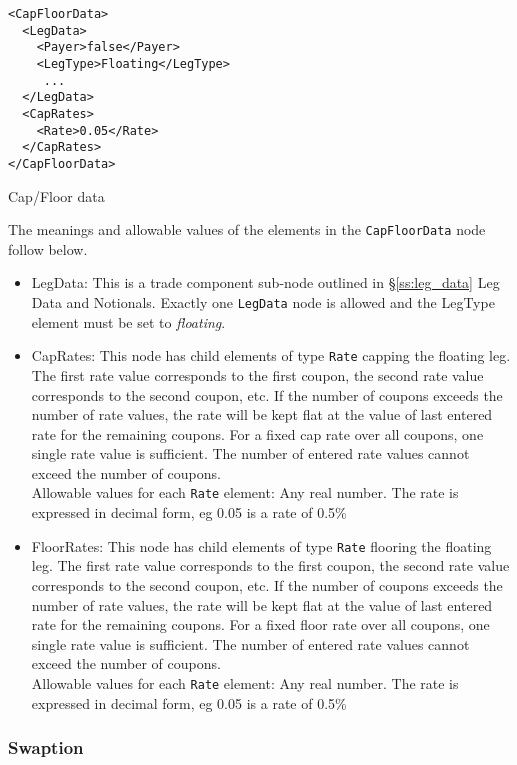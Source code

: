 \begin{listing}[H]
\begin{verbatim}
<CapFloorData>
  <LegData>
    <Payer>false</Payer>
    <LegType>Floating</LegType>
     ...
  </LegData>
  <CapRates>
    <Rate>0.05</Rate>
  </CapRates>
</CapFloorData>
\end{verbatim}
\caption{Cap/Floor data}
\label{lst:capfloor_data}
\end{listing}

The meanings and allowable values of the elements in the \lstinline!CapFloorData!  node follow below.

\begin{itemize}
\item LegData: This is a trade component sub-node outlined in \S \ref{ss:leg_data} Leg Data and Notionals. Exactly one \lstinline!LegData! node is allowed and the LegType element must be set to \emph{floating}.  
\item CapRates: This node has child elements of type \lstinline!Rate! capping the floating leg. The first rate value corresponds to the first coupon, the second rate value corresponds to the second coupon, etc. If the number of coupons exceeds the number of rate values, the rate will be kept flat at the value of last entered rate for the remaining coupons. For a fixed cap rate over all coupons, one single rate value is sufficient. The number of entered rate values cannot exceed the number of coupons. \\ Allowable values for each \lstinline!Rate! element:  Any real number. The rate is expressed in decimal form, eg 0.05 is a rate of  0.5\%
\item FloorRates: This node has child elements of type \lstinline!Rate! flooring the floating leg.  The first rate value corresponds to the first coupon, the second rate value corresponds to the second coupon, etc. If the number of coupons exceeds the number of rate values, the rate will be kept flat at the value of last entered rate for the remaining coupons. For a fixed floor rate over all coupons, one single rate value is sufficient. The number of entered rate values cannot exceed the number of coupons.\\ Allowable values for each \lstinline!Rate! element:  Any real number. The rate is expressed in decimal form, eg 0.05 is a rate of  0.5\%

\end{itemize}

\subsubsection{Swaption}

